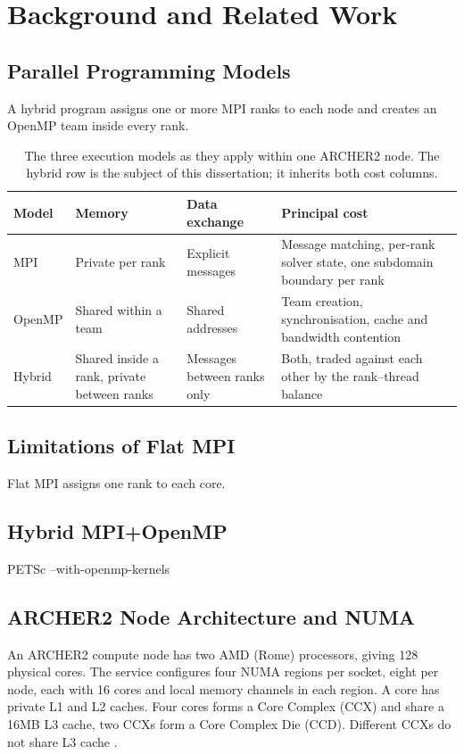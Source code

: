 \documentclass[12pt,a4paper,notitlepage]{report}
\begin{document}
\chapter{Background and Related Work}


\section{Parallel Programming Models}
A hybrid program assigns one or more MPI ranks to each node and creates an OpenMP team
inside every rank.
\begin{table}[htbp]
  \centering
  \caption{The three execution models as they apply within one ARCHER2 node. The hybrid
  row is the subject of this dissertation; it inherits both cost columns.}
  \label{tab:models}
  \begin{tabular}{l p{} p{} p{}}
    \toprule
    Model & Memory & Data exchange & Principal cost \\
    \midrule
    MPI    & Private per rank
           & Explicit messages
           & Message matching, per-rank solver state, one subdomain boundary per rank \\
    \addlinespace
    OpenMP & Shared within a team
           & Shared addresses
           & Team creation, synchronisation, cache and bandwidth contention \\
    \addlinespace
    Hybrid & Shared inside a rank, private between ranks
           & Messages between ranks only
           & Both, traded against each other by the rank--thread balance \\
    \bottomrule
  \end{tabular}
\end{table}


\section{Limitations of Flat MPI}
Flat MPI assigns one rank to each core.

\section{Hybrid MPI+OpenMP}
\label{sec:hybrid}
PETSc --with-openmp-kernels

\section{ARCHER2 Node Architecture and NUMA}
\label{sec:archer2}
An ARCHER2 compute node has two AMD (Rome) processors,  giving 128 physical cores.
The service configures four NUMA regions per socket, eight per node, each with 16 cores and local memory
channels in each region. A core has private L1 and L2 caches. Four cores forms a
Core Complex (CCX) and share a 16MB L3 cache, two CCXs form a Core Complex Die (CCD). 
Different CCXs do not share L3 cache \cite{archer2_hardware}.
\end{document}
